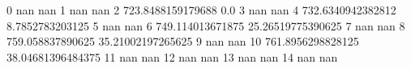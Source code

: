 0 nan nan
1 nan nan
2 723.8488159179688 0.0
3 nan nan
4 732.6340942382812 8.7852783203125
5 nan nan
6 749.114013671875 25.26519775390625
7 nan nan
8 759.058837890625 35.21002197265625
9 nan nan
10 761.8956298828125 38.04681396484375
11 nan nan
12 nan nan
13 nan nan
14 nan nan
